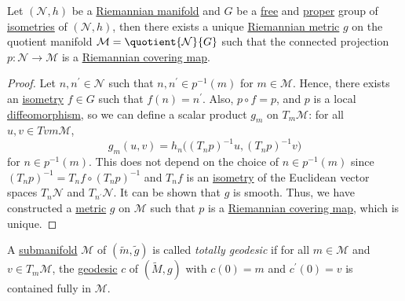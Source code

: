 \begin{proposition}
	Let \((\mathcal{N}, h )\) be a \hyperref[def:Riemannian-manifold]{Riemannian manifold} and \(G\) be a \href{https://en.wikipedia.org/wiki/Free_group}{free} and \href{https://mathworld.wolfram.com/ProperGroupAction.html}{proper} group of \hyperref[def:isometry]{isometries} of \((\mathcal{N} , h)\), then there exists a unique \hyperref[def:Riemannian-metric]{Riemannian metric} \(g\) on the quotient manifold \(\mathcal{M} = \quotient{\mathcal{N} }{G} \) such that the connected projection \(p\colon \mathcal{N} \to \mathcal{M} \) is a \hyperref[def:Riemannian-covering-map]{Riemannian covering map}.
\end{proposition}
\begin{proof}
	Let \(n, n^\prime \in \mathcal{N} \) such that \(n, n^\prime \in p ^{-1} (m)\) for \(m\in \mathcal{M} \). Hence, there exists an \hyperref[def:isometry]{isometry} \(f\in G\) such that \(f(n) = n^\prime \). Also, \(p \circ f = p\), and \(p\) is a local \hyperref[def:diffeomorphism]{diffeomorphism}, so we can define a scalar product \(g_m\) on \(T_m \mathcal{M} \): for all \(u, v\in Tvm \mathcal{M} \),
	\[
		g_m(u, v) = h_n\big( (T_n p)^{-1} u, (T_n p)^{-1} v\big)
	\]
	for \(n\in p ^{-1} (m)\). This does not depend on the choice of \(n\in p ^{-1} (m)\) since \((T_n p)^{-1} = T_n f \circ (T_n p)^{-1} \) and \(T_n f\) is an \hyperref[def:isometry]{isometry} of the Euclidean vector spaces \(T_n \mathcal{N} \) and \(T_{n^\prime } \mathcal{N} \). It can be shown that \(g\) is smooth. Thus, we have constructed a \hyperref[def:Riemannian-metric]{metric} \(g\) on \(\mathcal{M} \) such that \(p\) is a \hyperref[def:Riemannian-covering-map]{Riemannian covering map}, which is unique.
\end{proof}

\begin{definition}\label{def:totally-geodesic}
	A \hyperref[def:submanifold]{submanifold} \(\mathcal{M} \) of \((\widetilde{m} , \widetilde{g} )\) is called \emph{totally geodesic} if for all \(m\in \mathcal{M} \) and \(v\in T_m \mathcal{M} \), the \hyperref[def:geodesic]{geodesic} \(c\) of \((\widetilde{M}, g)\) with \(c(0) = m\) and \(c^\prime (0) = v\) is contained fully in \(\mathcal{M} \).
\end{definition}


